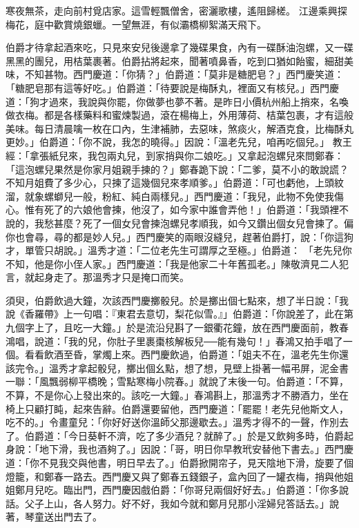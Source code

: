 寒夜無茶，走向前村覓店家。這雪輕飄僧舍，密灑歌樓，遙阻歸槎。
江邊乘興探梅花，庭中歡賞燒銀蠟。一望無涯，有似灞橋柳絮滿天飛下。

伯爵才待拿起酒來吃，只見來安兒後邊拿了幾碟果食，內有一碟酥油泡螺，又一碟黑黑的團兒，用桔葉裹著。伯爵拈將起來，聞著噴鼻香，吃到口猶如飴蜜，細甜美味，不知甚物。西門慶道：「你猜？」伯爵道：「莫非是糖肥皂？」西門慶笑道：「糖肥皂那有這等好吃。」伯爵道：「待要說是梅酥丸，裡面又有核兒。」西門慶道：「狗才過來，我說與你罷，你做夢也夢不著。是昨日小價杭州船上捎來，名喚做衣梅。都是各樣藥料和蜜煉製過，滾在楊梅上，外用薄荷、桔葉包裹，才有這般美味。每日清晨噙一枚在口內，生津補肺，去惡味，煞痰火，解酒克食，比梅酥丸更妙。」伯爵道：「你不說，我怎的曉得。」因說：「溫老先兒，咱再吃個兒。」 教王經：「拿張紙兒來，我包兩丸兒，到家捎與你二娘吃。」又拿起泡螺兒來問鄭春：「這泡螺兒果然是你家月姐親手揀的？」鄭春跪下說：「二爹，莫不小的敢說謊？不知月姐費了多少心，只揀了這幾個兒來孝順爹。」伯爵道：「可也虧他，上頭紋溜，就象螺螄兒一般，粉紅、純白兩樣兒。」西門慶道：「我兒，此物不免使我傷心。惟有死了的六娘他會揀，他沒了，如今家中誰會弄他！」伯爵道：「我頭裡不說的，我愁甚麼？死了一個女兒會揀泡螺兒孝順我，如今又鑽出個女兒會揀了。偏你也會尋，尋的都是妙人兒。」西門慶笑的兩眼沒縫兒，趕著伯爵打，說：「你這狗才，單管只胡說。」溫秀才道：「二位老先生可謂厚之至極。」伯爵道： 「老先兒你不知，他是你小侄人家。」西門慶道：「我是他家二十年舊孤老。」陳敬濟見二人犯言，就起身走了。那溫秀才只是掩口而笑。

須臾，伯爵飲過大鐘，次該西門慶擲骰兒。於是擲出個七點來，想了半日說：「我說《香羅帶》上一句唱：『東君去意切，梨花似雪。』」伯爵道：「你說差了，此在第九個字上了，且吃一大鐘。」於是流沿兒斟了一銀衢花鐘，放在西門慶面前，教春鴻唱，說道：「我的兒，你肚子里裹棗核解板兒──能有幾句！」春鴻又拍手唱了一個。看看飲酒至昏，掌燭上來。西門慶飲過，伯爵道：「姐夫不在，溫老先生你還該完令。」溫秀才拿起骰兒，擲出個幺點，想了想，見壁上掛著一幅弔屏，泥金書一聯：「風飄弱柳平橋晚；雪點寒梅小院春。」就說了末後一句。伯爵道：「不算，不算，不是你心上發出來的。該吃一大鐘。」春鴻斟上，那溫秀才不勝酒力，坐在椅上只顧打盹，起來告辭。伯爵還要留他，西門慶道：「罷罷！老先兒他斯文人，吃不的。」令畫童兒：「你好好送你溫師父那邊歇去。」溫秀才得不的一聲，作別去了。伯爵道：「今日葵軒不濟，吃了多少酒兒？就醉了。」於是又飲夠多時，伯爵起身說：「地下滑，我也酒夠了。」因說：「哥，明日你早教玳安替他下書去。」西門慶道：「你不見我交與他書，明日早去了。」伯爵掀開帘子，見天陰地下滑，旋要了個燈籠，和鄭春一路去。西門慶又與了鄭春五錢銀子，盒內回了一罐衣梅，捎與他姐姐鄭月兒吃。臨出門，西門慶因戲伯爵：「你哥兒兩個好好去。」伯爵道：「你多說話。父子上山，各人努力。好不好，我如今就和鄭月兒那小淫婦兒答話去。」說著，琴童送出門去了。

